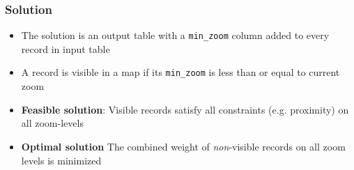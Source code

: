 \documentclass{beamer}
\begin{document}
\frame
{
  \frametitle{Solution}
  \begin{itemize}
  \item The solution is an output table with a \texttt{min\_zoom} column added to every record in input table
  \item A record is visible in a map if its \texttt{min\_zoom} is less than or equal to current zoom
  \item \textbf{Feasible solution}: Visible records satisfy all constraints (e.g. proximity) on all zoom-levels
  \item \textbf{Optimal solution} The combined weight of \emph{non}-visible records on all zoom levels is minimized
  \end{itemize}
  \begin{center}
  \end{center}
}
\end{document}
